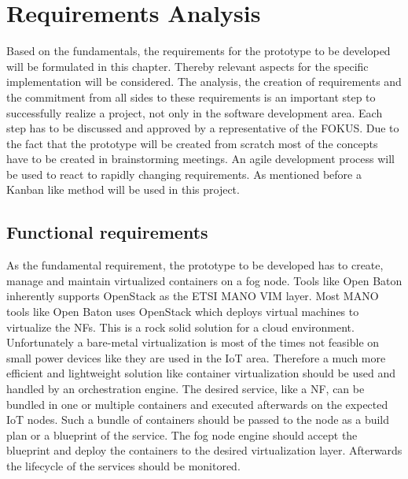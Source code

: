 \chapter{Requirements Analysis}
\label{chapter:requirements-analysis}
\minitoc\vspace{.5cm}
Based on the fundamentals, the requirements for the prototype to be developed will be formulated in this chapter.
Thereby relevant aspects for the specific implementation will be considered.
The analysis, the creation of requirements and the commitment from all sides to these requirements is an important step to successfully realize a project, not only in the software development area.
Each step has to be discussed and approved by a representative of the \ac{FOKUS}.
Due to the fact that the prototype will be created from scratch most of the concepts have to be created in brainstorming meetings.
An agile development process will be used to react to rapidly changing requirements.
As mentioned before a Kanban like method will be used in this project.


\section{Functional requirements}
\label{section:functional-requirements}
As the fundamental requirement, the prototype to be developed has to create, manage and maintain virtualized containers on a fog node.
Tools like Open Baton inherently supports OpenStack as the \ac{ETSI} \ac{MANO} \ac{VIM} layer.
Most \ac{MANO} tools like Open Baton uses OpenStack which deploys virtual machines to virtualize the \acp{NF}.
This is a rock solid solution for a cloud environment.
Unfortunately a bare-metal virtualization is most of the times not feasible on small power devices like they are used in the \ac{IoT} area.
Therefore a much more efficient and lightweight solution like container virtualization should be used and handled by an orchestration engine.
The desired service, like a \ac{NF}, can be bundled in one or multiple containers and executed afterwards on the expected \ac{IoT} nodes.
Such a bundle of containers should be passed to the node as a build plan or a blueprint of the service.
The fog node engine should accept the blueprint and deploy the containers to the desired virtualization layer.
Afterwards the lifecycle of the services should be monitored.


